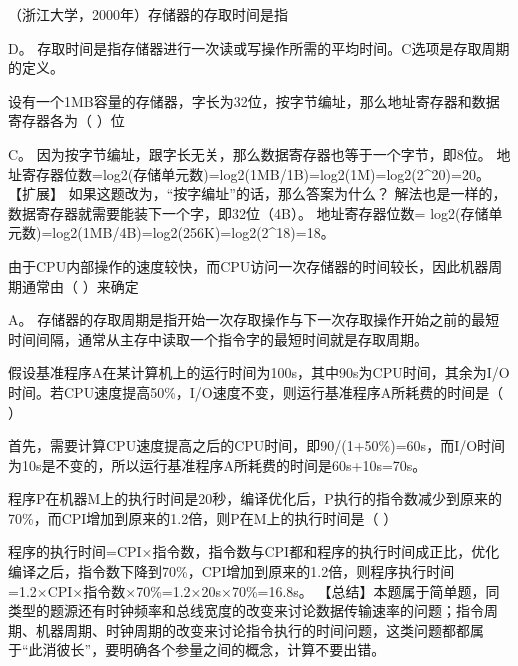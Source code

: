 \question （浙江大学，2000年）存储器的存取时间是指
\par{}
\begin{solution}D。
存取时间是指存储器进行一次读或写操作所需的平均时间。C选项是存取周期的定义。
\end{solution}
\question 设有一个1MB容量的存储器，字长为32位，按字节编址，那么地址寄存器和数据寄存器各为（
）位
\par{}
\begin{solution}C。 因为按字节编址，跟字长无关，那么数据寄存器也等于一个字节，即8位。
地址寄存器位数=log2(存储单元数)=log2(1MB/1B)=log2(1M)=log2(2\^{}20)=20。
【扩展】 如果这题改为，``按字编址''的话，那么答案为什么？
解法也是一样的，数据寄存器就需要能装下一个字，即32位（4B）。
地址寄存器位数=
log2(存储单元数)=log2(1MB/4B)=log2(256K)=log2(2\^{}18)=18。
\end{solution}
\question 由于CPU内部操作的速度较快，而CPU访问一次存储器的时间较长，因此机器周期通常由（
）来确定
\par{}
\begin{solution}A。
存储器的存取周期是指开始一次存取操作与下一次存取操作开始之前的最短时间间隔，通常从主存中读取一个指令字的最短时间就是存取周期。
\end{solution}
\question 假设基准程序A在某计算机上的运行时间为100s，其中90s为CPU时间，其余为I/O时间。若CPU速度提高50\%，I/O速度不变，则运行基准程序A所耗费的时间是（
）
\par{}
\begin{solution}首先，需要计算CPU速度提高之后的CPU时间，即90/(1+50\%)=60s，而I/O时间为10s是不变的，所以运行基准程序A所耗费的时间是60s+10s=70s。
\end{solution}
\question 程序P在机器M上的执行时间是20秒，编译优化后，P执行的指令数减少到原来的70\%，而CPI增加到原来的1.2倍，则P在M上的执行时间是（
）
\par{}
\begin{solution}程序的执行时间=CPI×指令数，指令数与CPI都和程序的执行时间成正比，优化编译之后，指令数下降到70\%，CPI增加到原来的1.2倍，则程序执行时间=1.2×CPI×指令数×70\%=1.2×20s×70\%=16.8s。
【总结】本题属于简单题，同类型的题源还有时钟频率和总线宽度的改变来讨论数据传输速率的问题；指令周期、机器周期、时钟周期的改变来讨论指令执行的时间问题，这类问题都都属于``此消彼长''，要明确各个参量之间的概念，计算不要出错。
\end{solution}

